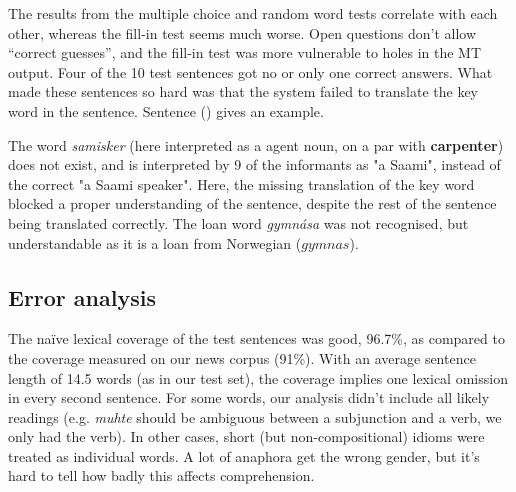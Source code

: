 \documentclass{book}
\begin{document}
The results from the multiple choice and random word tests correlate
with each other, whereas the fill-in test seems much worse. Open
questions don't allow ``correct guesses'', and the fill-in test was
more vulnerable to holes in the MT output. Four of the 10 test
sentences got no or only one correct answers. What made these
sentences so hard was that the system failed to translate the key word
in the sentence. Sentence () gives an example.



The word \textit{samisker} (here interpreted as a agent noun, on a par
with \textbf{carpenter}) does not exist, and is interpreted by 9 of
the informants as "a Saami", instead of the correct "a Saami speaker".
Here, the missing translation of the key word blocked a proper
understanding of the sentence, despite the rest of the sentence being
translated correctly. The loan word \textit{gymn\'{a}sa} was not
recognised, but understandable as it is a loan from Norwegian
($gymnas$).



\subsection{Error analysis}



The na\"{i}ve lexical coverage of the test sentences was good, 96.7\%, 
as compared to the coverage measured on our news corpus (91\%). With
an average sentence length of 14.5 words (as in our test set), the coverage
implies one lexical omission in every second sentence. For
some words, our analysis didn't include all likely readings (e.g.
\textit{muhte} should be ambiguous between a subjunction and a verb,
we only had the verb). In other cases, short (but non-compositional)
idioms were treated as individual words. A lot of anaphora get the
wrong gender, but it's hard to tell how badly this affects
comprehension.
\end{document}
